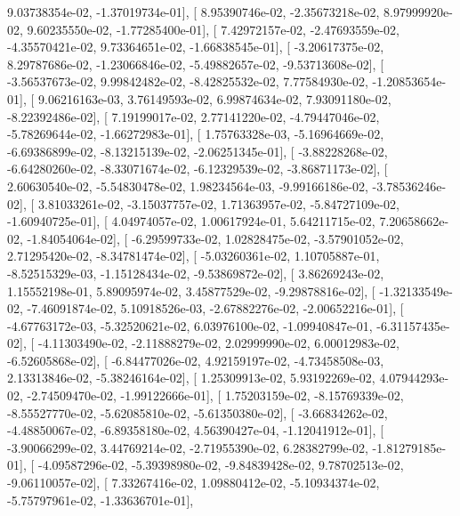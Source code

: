 \documentclass{article}
\begin{document}
          9.03738354e-02,  -1.37019734e-01],
       [  8.95390746e-02,  -2.35673218e-02,   8.97999920e-02,
          9.60235550e-02,  -1.77285400e-01],
       [  7.42972157e-02,  -2.47693559e-02,  -4.35570421e-02,
          9.73364651e-02,  -1.66838545e-01],
       [ -3.20617375e-02,   8.29787686e-02,  -1.23066846e-02,
         -5.49882657e-02,  -9.53713608e-02],
       [ -3.56537673e-02,   9.99842482e-02,  -8.42825532e-02,
          7.77584930e-02,  -1.20853654e-01],
       [  9.06216163e-03,   3.76149593e-02,   6.99874634e-02,
          7.93091180e-02,  -8.22392486e-02],
       [  7.19199017e-02,   2.77141220e-02,  -4.79447046e-02,
         -5.78269644e-02,  -1.66272983e-01],
       [  1.75763328e-03,  -5.16964669e-02,  -6.69386899e-02,
         -8.13215139e-02,  -2.06251345e-01],
       [ -3.88228268e-02,  -6.64280260e-02,  -8.33071674e-02,
         -6.12329539e-02,  -3.86871173e-02],
       [  2.60630540e-02,  -5.54830478e-02,   1.98234564e-03,
         -9.99166186e-02,  -3.78536246e-02],
       [  3.81033261e-02,  -3.15037757e-02,   1.71363957e-02,
         -5.84727109e-02,  -1.60940725e-01],
       [  4.04974057e-02,   1.00617924e-01,   5.64211715e-02,
          7.20658662e-02,  -1.84054064e-02],
       [ -6.29599733e-02,   1.02828475e-02,  -3.57901052e-02,
          2.71295420e-02,  -8.34781474e-02],
       [ -5.03260361e-02,   1.10705887e-01,  -8.52515329e-03,
         -1.15128434e-02,  -9.53869872e-02],
       [  3.86269243e-02,   1.15552198e-01,   5.89095974e-02,
          3.45877529e-02,  -9.29878816e-02],
       [ -1.32133549e-02,  -7.46091874e-02,   5.10918526e-03,
         -2.67882276e-02,  -2.00652216e-01],
       [ -4.67763172e-03,  -5.32520621e-02,   6.03976100e-02,
         -1.09940847e-01,  -6.31157435e-02],
       [ -4.11303490e-02,  -2.11888279e-02,   2.02999990e-02,
          6.00012983e-02,  -6.52605868e-02],
       [ -6.84477026e-02,   4.92159197e-02,  -4.73458508e-03,
          2.13313846e-02,  -5.38246164e-02],
       [  1.25309913e-02,   5.93192269e-02,   4.07944293e-02,
         -2.74509470e-02,  -1.99122666e-01],
       [  1.75203159e-02,  -8.15769339e-02,  -8.55527770e-02,
         -5.62085810e-02,  -5.61350380e-02],
       [ -3.66834262e-02,  -4.48850067e-02,  -6.89358180e-02,
          4.56390427e-04,  -1.12041912e-01],
       [ -3.90066299e-02,   3.44769214e-02,  -2.71955390e-02,
          6.28382799e-02,  -1.81279185e-01],
       [ -4.09587296e-02,  -5.39398980e-02,  -9.84839428e-02,
          9.78702513e-02,  -9.06110057e-02],
       [  7.33267416e-02,   1.09880412e-02,  -5.10934374e-02,
         -5.75797961e-02,  -1.33636701e-01],
\end{document}
